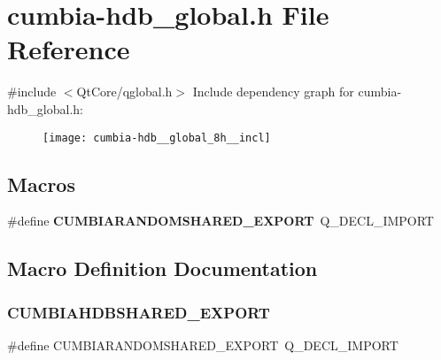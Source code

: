 \section{cumbia-\/hdb\+\_\+global.h File Reference}
\label{cumbia-hdb__global_8h}
{\ttfamily \#include $<$Qt\+Core/qglobal.\+h$>$}\newline
Include dependency graph for cumbia-\/hdb\+\_\+global.h\+:
\nopagebreak
\begin{figure}[H]
\begin{center}
\leavevmode
\texttt{[image: cumbia-hdb\_\_global\_8h\_\_incl]}
\end{center}
\end{figure}
\subsection*{Macros}
\begin{DoxyCompactItemize}
\item 
\#define \textbf{ C\+U\+M\+B\+I\+A\+R\+A\+N\+D\+O\+M\+S\+H\+A\+R\+E\+D\+\_\+\+E\+X\+P\+O\+RT}~Q\+\_\+\+D\+E\+C\+L\+\_\+\+I\+M\+P\+O\+RT
\end{DoxyCompactItemize}


\subsection{Macro Definition Documentation}
\mbox{\label{cumbia-hdb__global_8h_ab1ec4d7cb033a10e01c43d4226080b1d}} 
\subsubsection{CUMBIAHDBSHARED\_EXPORT}
{\footnotesize\ttfamily \#define C\+U\+M\+B\+I\+A\+R\+A\+N\+D\+O\+M\+S\+H\+A\+R\+E\+D\+\_\+\+E\+X\+P\+O\+RT~Q\+\_\+\+D\+E\+C\+L\+\_\+\+I\+M\+P\+O\+RT}

